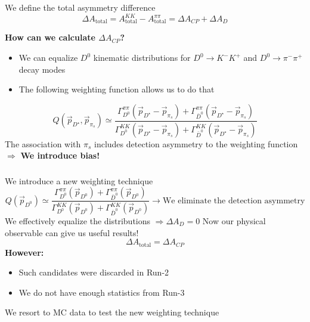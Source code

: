 \documentclass{beamer}
\begin{document}
\begin{frame}
      \frametitle{\insertsubsectionhead}
      \rightarrow We define the total asymmetry difference
      \begin{equation*}
            \Delta A_\text{total} = A_\text{total}^{KK} - A_\text{total}^{\pi\pi} = \Delta A_{CP} + \Delta A_{D}
      \end{equation*}

      \textbf{How can we calculate $\Delta A_{CP}$?}
      \begin{itemize}
            \item We can equalize $D^0$ kinematic distributions for $D^0\to K^-K^+$ and $D^0\to \pi^-\pi^+$ decay modes
            \item The following weighting function allows us to do that
      \end{itemize}
      \begin{equation*}
            Q(\vec{p}_{D^\star}, \vec{p}_{\pi_s}) \simeq \frac{\Gamma_{D^0}^{\pi\pi}(\vec{p}_{D^\star} - \vec{p}_{\pi_s}) + \Gamma_{\bar{D}^0}^{\pi\pi}(\vec{p}_{D^\star} - \vec{p}_{\pi_s})}{\Gamma_{D^0}^{KK}(\vec{p}_{D^\star} - \vec{p}_{\pi_s}) + \Gamma_{\bar{D}^0}^{KK}(\vec{p}_{D^\star} - \vec{p}_{\pi_s})}
      \end{equation*}
      \bigbreak
      \to The association with $\pi_s$ includes detection asymmetry to the weighting function $\Rightarrow$ {\bf We introduce bias!}
\end{frame}

\begin{frame}
      \frametitle{\insertsubsectionhead}
      \rightarrow We introduce a new weighting technique
      \begin{equation*}
            Q(\vec{p}_{D^0}) \simeq \frac{\Gamma_{D^0}^{\pi\pi}(\vec{p}_{D^0}) + \Gamma_{\bar{D}^0}^{\pi\pi}(\vec{p}_{D^0})}{\Gamma_{D^0}^{KK}(\vec{p}_{D^0}) + \Gamma_{\bar{D}^0}^{KK}(\vec{p}_{D^0})}\to \text{We eliminate the detection asymmetry}
      \end{equation*}
      \rightarrow We effectively equalize the distributions $\Rightarrow \Delta A_D = 0$
      \bigbreak
      \rightarrow Now our physical observable can give us useful results!
      \begin{equation*}
            \boxed{\Delta A_\text{total} = \Delta A_{CP}}
      \end{equation*}
      \bigbreak 
      {\bf However:}
      \begin{itemize}
            \item Such candidates were discarded in Run-2
            \item We do not have enough statistics from Run-3
      \end{itemize}
      \rightarrow We resort to MC data to test the new weighting technique
\end{frame}
\end{document}
